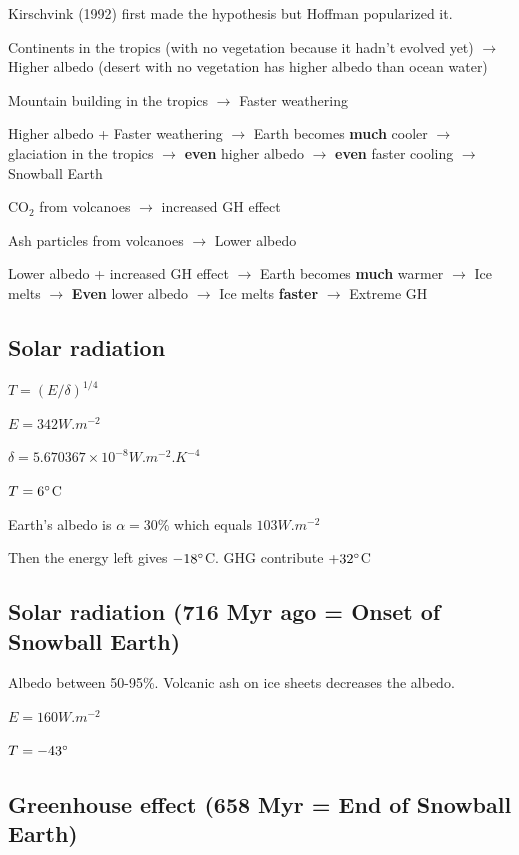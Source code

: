 Kirschvink (1992) first made the hypothesis but Hoffman popularized it.

Continents in the tropics (with no vegetation because it hadn't evolved yet)
$\rightarrow$
Higher albedo (desert with no vegetation has higher albedo than ocean water)

Mountain building in the tropics $\rightarrow$ Faster weathering

Higher albedo + Faster weathering $\rightarrow$ Earth becomes \textbf{much}
cooler $\rightarrow$ glaciation in the tropics $\rightarrow$ \textbf{even}
higher albedo $\rightarrow$ \textbf{even} faster cooling
$\rightarrow$ Snowball Earth

CO$_2$ from volcanoes $\rightarrow$ increased GH effect

Ash particles from volcanoes $\rightarrow$ Lower albedo

Lower albedo + increased GH effect $\rightarrow$ Earth becomes \textbf{much}
warmer $\rightarrow$ Ice melts $\rightarrow$ \textbf{Even} lower albedo
$\rightarrow$ Ice melts \textbf{faster} $\rightarrow$ Extreme GH


\subsection{Solar radiation}

$T = (E/\delta)^{1/4}$

$E = 342 W.m^{-2}$

$\delta = 5.670367 \times 10^{-8} W.m^{-2}.K^{-4}$

$T = 6\degree$C

Earth's albedo is $\alpha = 30$\% which equals $103W.m^{-2}$

Then the energy left gives $-18\degree$C. GHG contribute $+32\degree$C

\subsection{Solar radiation (716 Myr ago = Onset of Snowball Earth)}

Albedo between 50-95\%. Volcanic ash on ice sheets decreases the albedo.

$E = 160 W.m^{-2}$

$T = -43 \degree$

\subsection{Greenhouse effect (658 Myr = End of Snowball Earth)}

